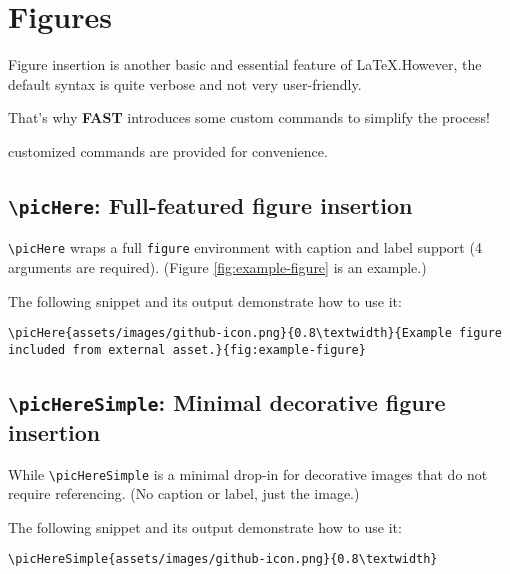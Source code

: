 \newpage
\section{Figures}

Figure insertion is another basic and essential feature of {\LaTeX}.However, the default syntax is quite verbose and not very user-friendly.

That's why \textbf{FAST} introduces some custom commands to simplify the process!

 customized commands are provided for convenience. 

\subsection{\texttt{\textbackslash picHere}: Full-featured figure insertion}

\texttt{\textbackslash picHere} wraps a full \texttt{figure} environment with caption and label support (4 arguments are required). (Figure \ref{fig:example-figure} is an example.)

\noindent The following snippet and its output demonstrate how to use it:

\begin{lstlisting}[style=githubLight, language={[LaTeX]TeX}, label={lst:figure-helper-macros}]
\picHere{assets/images/github-icon.png}{0.8\textwidth}{Example figure included from external asset.}{fig:example-figure}
\end{lstlisting}


\subsection{\texttt{\textbackslash picHereSimple}: Minimal decorative figure insertion}

While \texttt{\textbackslash picHereSimple} is a minimal drop-in for decorative images that do not require referencing. (No caption or label, just the image.)

\noindent The following snippet and its output demonstrate how to use it:

\begin{lstlisting}[style=githubLight, language={[LaTeX]TeX}, label={lst:figure-helper-macros}]
    \picHereSimple{assets/images/github-icon.png}{0.8\textwidth}
\end{lstlisting}

